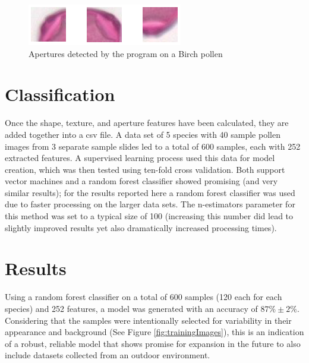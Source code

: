 \documentclass[runningheads,a4paper]{llncs}
\begin{document}
\begin{figure}[h!]
\begin{center}
\includegraphics[width=0.7\columnwidth]{figures/apertures/apertures.PNG}
\caption{\label{fig:aperture_detection}
Apertures detected by the program on a Birch pollen%
}
\end{center}
\end{figure}

\section{Classification}

Once the shape, texture, and aperture features have been calculated, they are added together into a csv file. A data set of 5 species with 40 sample pollen images from 3 separate sample slides led to a total of 600 samples, each with 252 extracted features. A supervised learning process used this data for model creation, which was then tested using ten-fold cross validation. Both support vector machines and a random forest classifier showed promising (and very similar results); for the results reported here a random forest classifier was used due to faster processing on the larger data sets. The n-estimators parameter for this method was set to a typical size of 100 (increasing this number did lead to slightly improved results yet also dramatically increased processing times).
    
  
  
  
  

\section{Results}

Using a random forest classifier on a total of 600 samples (120 each for each species) and 252 features, a model was generated with an accuracy of $87\% \pm 2\%$. Considering that the samples were intentionally selected for variability in their appearance and background (See Figure \ref{fig:trainingImages}), this is an indication of a robust, reliable model that shows promise for expansion in the future to also include datasets collected from an outdoor environment. 
\end{document}

